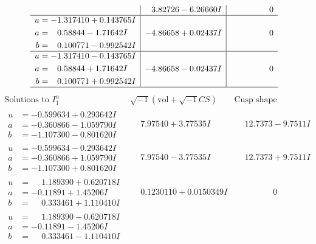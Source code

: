 \documentclass[1p]{elsarticle_modified}
\theoremstyle{definition}
\newcommand{\I}{\sqrt{-1}}
\begin{document}
$$\begin{array}{c|c|c}
 & \phantom{-}3.82726 - 6.26660 I & \phantom{-0.000000 } 0 \\ \hline\begin{aligned}
u &= -1.317410 + 0.143765 I \\
a &= \phantom{-}0.58844 - 1.71642 I \\
b &= \phantom{-}0.100771 - 0.992542 I\end{aligned}
 & -4.86658 + 0.02437 I & \phantom{-0.000000 } 0 \\ \hline\begin{aligned}
u &= -1.317410 - 0.143765 I \\
a &= \phantom{-}0.58844 + 1.71642 I \\
b &= \phantom{-}0.100771 + 0.992542 I\end{aligned}
 & -4.86658 - 0.02437 I & \phantom{-0.000000 } 0\\
 \hline 
 \end{array}$$\newpage$$\begin{array}{c|c|c}  
\text{Solutions to }I^u_{1}& \I (\text{vol} + \sqrt{-1}CS) & \text{Cusp shape}\\
 \hline 
\begin{aligned}
u &= -0.599634 + 0.293642 I \\
a &= -0.360866 - 1.059790 I \\
b &= -1.107300 - 0.801620 I\end{aligned}
 & \phantom{-}7.97540 + 3.77535 I & \phantom{-}12.7373 - 9.7511 I \\ \hline\begin{aligned}
u &= -0.599634 - 0.293642 I \\
a &= -0.360866 + 1.059790 I \\
b &= -1.107300 + 0.801620 I\end{aligned}
 & \phantom{-}7.97540 - 3.77535 I & \phantom{-}12.7373 + 9.7511 I \\ \hline\begin{aligned}
u &= \phantom{-}1.189390 + 0.620718 I \\
a &= -0.11891 + 1.45206 I \\
b &= \phantom{-}0.333461 + 1.110410 I\end{aligned}
 & \phantom{-}0.1230110 + 0.0150349 I & \phantom{-0.000000 } 0 \\ \hline\begin{aligned}
u &= \phantom{-}1.189390 - 0.620718 I \\
a &= -0.11891 - 1.45206 I \\
b &= \phantom{-}0.333461 - 1.110410 I\end{aligned}

\end{array}$$
\end{document}
